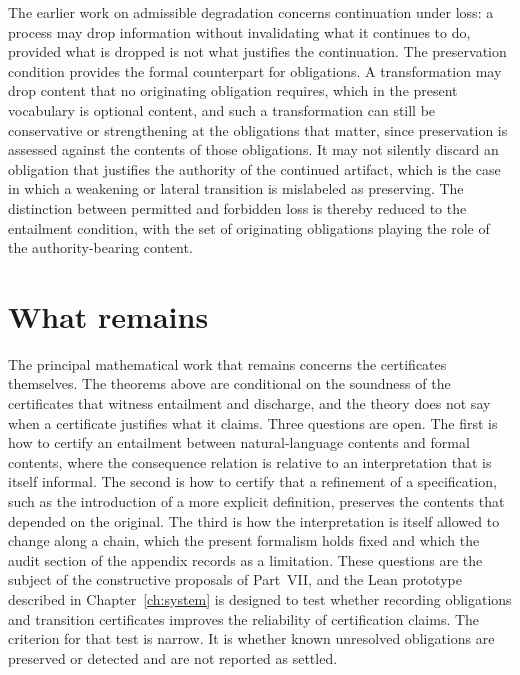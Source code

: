 The earlier work on admissible degradation concerns continuation under loss: a process may drop information without invalidating what it continues to do, provided what is dropped is not what justifies the continuation. The preservation condition provides the formal counterpart for obligations. A transformation may drop content that no originating obligation requires, which in the present vocabulary is optional content, and such a transformation can still be conservative or strengthening at the obligations that matter, since preservation is assessed against the contents of those obligations. It may not silently discard an obligation that justifies the authority of the continued artifact, which is the case in which a weakening or lateral transition is mislabeled as preserving. The distinction between permitted and forbidden loss is thereby reduced to the entailment condition, with the set of originating obligations playing the role of the authority-bearing content.

\section{What remains}

The principal mathematical work that remains concerns the certificates themselves. The theorems above are conditional on the soundness of the certificates that witness entailment and discharge, and the theory does not say when a certificate justifies what it claims. Three questions are open. The first is how to certify an entailment between natural-language contents and formal contents, where the consequence relation is relative to an interpretation that is itself informal. The second is how to certify that a refinement of a specification, such as the introduction of a more explicit definition, preserves the contents that depended on the original. The third is how the interpretation is itself allowed to change along a chain, which the present formalism holds fixed and which the audit section of the appendix records as a limitation. These questions are the subject of the constructive proposals of Part~VII, and the Lean prototype described in Chapter~\ref{ch:system} is designed to test whether recording obligations and transition certificates improves the reliability of certification claims. The criterion for that test is narrow. It is whether known unresolved obligations are preserved or detected and are not reported as settled.

